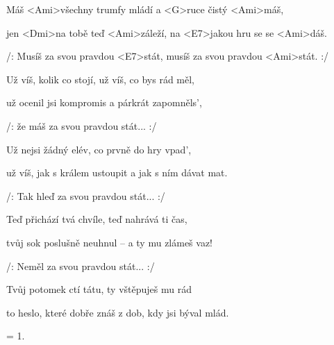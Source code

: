 

\zs
	Máš <Ami>všechny trumfy mládí a <G>ruce čistý <Ami>máš,

 jen <Dmi>na tobě teď <Ami>záleží, na <E7>jakou hru se se <Ami>dáš.

 /: Musíš za svou pravdou <E7>stát, musíš za svou pravdou <Ami>stát. :/
\ks

\zs
	Už víš, kolik co stojí, už víš, co bys rád měl,

 už ocenil jsi kompromis a párkrát zapomněls',

 /: že máš za svou pravdou stát... :/
\ks

\zs
	Už nejsi žádný elév, co prvně do hry vpad',
	
	už víš, jak s králem ustoupit a jak s ním dávat mat.

 /: Tak hleď za svou pravdou stát... :/
\ks

\zs
	Teď přichází tvá chvíle, teď nahrává ti čas,
	
	tvůj sok poslušně neuhnul -- a ty mu zlámeš vaz!

 /: Neměl za svou pravdou stát... :/
\ks

\zs
	Tvůj potomek ctí tátu, ty vštěpuješ mu rád

 to heslo, které dobře znáš z dob, kdy jsi býval mlád.
\ks

\zs
	= 1.
\ks

\kp
